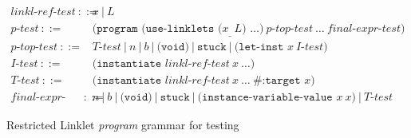 \begin{figure}[!h]
    \centering
    \begin{align*}
      \textit{linkl-ref-test}~::=~&~x~|~L \\
      \textit{p-test}~::=~&~\texttt{(program (use-linklets (}x\!_{\_}~L\texttt{) }\ldots\texttt{)}~p\textit{-top-test}~\ldots~\textit{final-expr-test}\texttt{)} \\
      \textit{p-top-test}~::=~&~T\textit{-test}~|~n~|~b~|~\texttt{(void)}~|~\texttt{stuck}~|~\texttt{(let-inst }x~I\textit{-test}\texttt{)} \\
      \textit{I-test}~::=~&~\texttt{(instantiate } \textit{linkl-ref-test}~x~\ldots\texttt{)} \\
      T\textit{-test}~::=~&~\texttt{(instantiate } \textit{linkl-ref-test}~x~\ldots~\texttt{\#:target }x\texttt{)} \\
      \textit{final-expr-test}~::=~&~n~|~b~|~\texttt{(void)}~|~\texttt{stuck}~|~\texttt{(instance-variable-value }x~x\texttt{)}~|~T\textit{-test}
    \end{align*}
    \caption{Restricted Linklet \emph{program} grammar for testing}
    \label{fig:restricted-linklet-program}
\end{figure}
